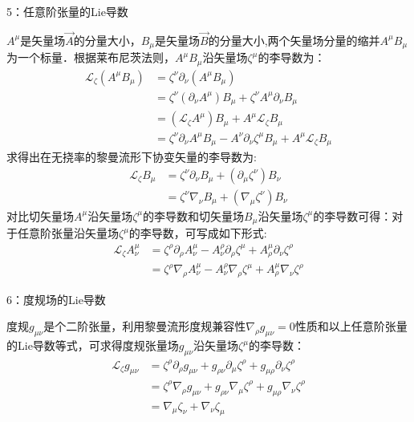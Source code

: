 5：任意阶张量的Lie导数

$A^{\mu}$是矢量场$\overrightarrow{A}$的分量大小，$B_{\mu}$是矢量场$\overrightarrow{B}$的分量大小,两个矢量场分量的缩并$A^{\mu}B_{\mu}$为一个标量．根据莱布尼茨法则，$A^{\mu}B_{\mu}$沿矢量场$\zeta^{\mu}$的李导数为：
$$\begin{aligned}
\mathcal{L}_{\zeta}\left(A^{\mu} B_{\mu}\right) &=\zeta^{\nu} \partial_{\nu}\left(A^{\mu} B_{\mu}\right) \\
&=\zeta^{\nu} (\partial_{\nu} A^{\mu}) B_{\mu}+\zeta^{\nu} A^{\mu} \partial_{\nu} B_{\mu} \\
&=(\mathcal{L}_{\zeta} A^{\mu}) B_{\mu}+A^{\mu} \mathcal{L}_{\zeta} B_{\mu} \\
&=\zeta^{\nu} \partial_{\nu} A^{\mu} B_{\mu}-A^{\nu} \partial_{\nu} \zeta^{\mu} B_{\mu}+A^{\mu} \mathcal{L}_{\zeta} B_{\mu }
\end{aligned}$$
求得出在无挠率的黎曼流形下协变矢量的李导数为:
$$\begin{aligned}
\mathcal{L}_{\zeta} B_{\mu} &=\zeta^{\nu} \partial_{\nu} B_{\mu}+(\partial_{\mu} \zeta^{\nu}) B_{\nu} \\
&=\zeta^{\nu} \nabla_{\nu} B_{\mu}+(\nabla_{\mu} \zeta^{\nu}) B_{\nu}
\end{aligned}$$
对比切矢量场$A^{\mu}$沿矢量场$\zeta^{\mu}$的李导数和切矢量场$B_{\mu}$沿矢量场$\zeta^{\mu}$的李导数可得：对于任意阶张量沿矢量场$\zeta^{\mu}$的李导数，可写成如下形式:
$$\begin{aligned}
\mathcal{L}_{\zeta} A_{\nu}^{\mu} &=\zeta^{\rho} \partial_{\rho} A_{\nu}^{\mu}-A_{\nu}^{\rho} \partial_{\rho} \zeta^{\mu}+A_{\rho}^{\mu} \partial_{\nu} \zeta^{\rho} \\
&=\zeta^{\rho} \nabla_{\rho} A_{\nu}^{\mu}-A_{\nu}^{\rho} \nabla_{\rho} \zeta^{\mu}+A_{\rho}^{\mu} \nabla_{\nu} \zeta^{\rho}
\end{aligned}$$

6：度规场的Lie导数

度规$g_{\mu \nu}$是个二阶张量，利用黎曼流形度规兼容性$\nabla_{\rho} g_{\mu \nu}=0$性质和以上任意阶张量的Lie导数等式，可求得度规张量场$g_{\mu \nu}$沿矢量场$\zeta^{\mu}$的李导数：
$$\begin{aligned}
\mathcal{L}_{\zeta} g_{\mu \nu} 
&=\zeta^{\rho} \partial_{\rho} g_{\mu \nu}+g_{\rho \nu} \partial_{\mu} \zeta^{\rho}+g_{\mu \rho} \partial_{\nu} \zeta^{\rho} \\
&=\zeta^{\rho} \nabla_{\rho} g_{\mu \nu}+g_{\rho \nu} \nabla_{\mu} \zeta^{\rho}+g_{\mu \rho} \nabla_{\nu} \zeta^{\rho} \\
&=\nabla_{\mu} \zeta_{\nu}+\nabla_{\nu} \zeta_{\mu} 
\end{aligned}$$

